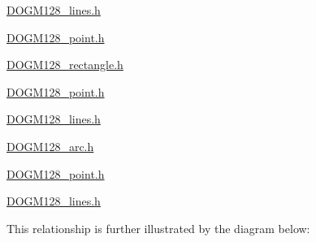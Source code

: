 \hyperlink{_d_o_g_m128__lines_8h}{D\-O\-G\-M128\-\_\-lines.\-h}
\begin{DoxyItemize}
\item \hyperlink{_d_o_g_m128__point_8h_source}{D\-O\-G\-M128\-\_\-point.\-h}
\end{DoxyItemize}

\hyperlink{_d_o_g_m128__rectangle_8h}{D\-O\-G\-M128\-\_\-rectangle.\-h}
\begin{DoxyItemize}
\item \hyperlink{_d_o_g_m128__point_8h_source}{D\-O\-G\-M128\-\_\-point.\-h}
\item \hyperlink{_d_o_g_m128__lines_8h}{D\-O\-G\-M128\-\_\-lines.\-h}
\end{DoxyItemize}

\hyperlink{_d_o_g_m128__arc_8h}{D\-O\-G\-M128\-\_\-arc.\-h}
\begin{DoxyItemize}
\item \hyperlink{_d_o_g_m128__point_8h_source}{D\-O\-G\-M128\-\_\-point.\-h}
\item \hyperlink{_d_o_g_m128__lines_8h}{D\-O\-G\-M128\-\_\-lines.\-h}
\end{DoxyItemize}

This relationship is further illustrated by the diagram below\-: 